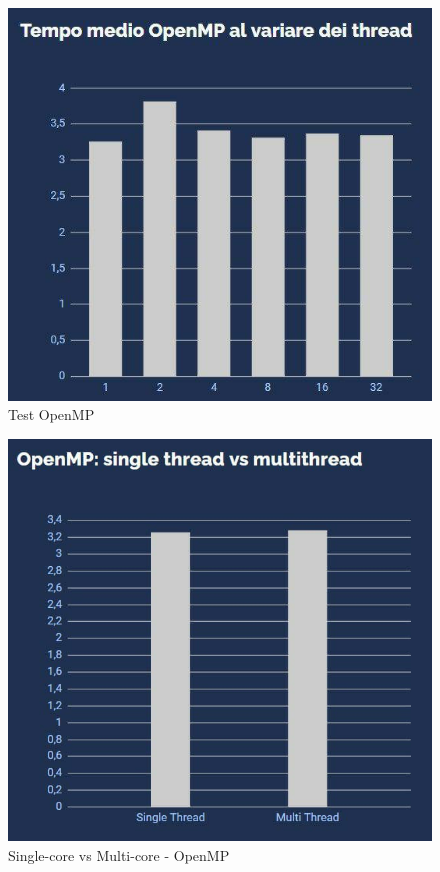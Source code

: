 \documentclass[twoside,twocolumn]{article}
\begin{document}
\begin{figure}
\begin{center}
\includegraphics[width=0.4 \textwidth]{Test OpenMP.png}
\caption{Test OpenMP}
\end{center}
\end{figure}

\begin{figure}
\begin{center}
\includegraphics[width=0.4 \textwidth]{OpenMP single vs multi.png}
\caption{Single-core vs Multi-core - OpenMP}
\end{center}
\end{figure}
\end{document}
